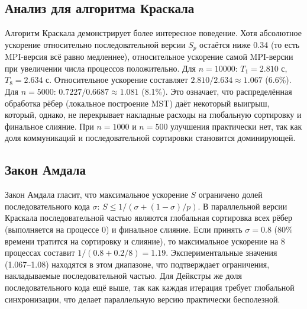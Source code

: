 \documentclass[14pt,a4paper]{article}
\begin{document}
\subsection{Анализ для алгоритма Краскала}
Алгоритм Краскала демонстрирует более интересное поведение. Хотя абсолютное ускорение относительно последовательной версии $S_p$ остаётся ниже 0.34 (то есть MPI-версия всё равно медленнее), относительное ускорение самой MPI-версии при увеличении числа процессов положительно. Для $n=10000$: $T_1=2.810$ с, $T_8=2.634$ с. Относительное ускорение составляет $2.810 / 2.634 \approx 1.067$ (6.6\%). Для $n=5000$: $0.7227 / 0.6687 \approx 1.081$ (8.1\%). Это означает, что распределённая обработка рёбер (локальное построение MST) даёт некоторый выигрыш, который, однако, не перекрывает накладные расходы на глобальную сортировку и финальное слияние. При $n=1000$ и $n=500$ улучшения практически нет, так как доля коммуникаций и последовательной сортировки становится доминирующей.

\subsection{Закон Амдала}
Закон Амдала гласит, что максимальное ускорение $S$ ограничено долей последовательного кода $\sigma$: $S \le 1 / (\sigma + (1-\sigma)/p)$. В параллельной версии Краскала последовательной частью являются глобальная сортировка всех рёбер (выполняется на процессе 0) и финальное слияние. Если принять $\sigma = 0.8$ (80\% времени тратится на сортировку и слияние), то максимальное ускорение на 8 процессах составит $1 / (0.8 + 0.2/8) = 1.19$. Экспериментальные значения (1.067–1.08) находятся в этом диапазоне, что подтверждает ограничения, накладываемые последовательной частью. Для Дейкстры же доля последовательного кода ещё выше, так как каждая итерация требует глобальной синхронизации, что делает параллельную версию практически бесполезной.
\end{document}
